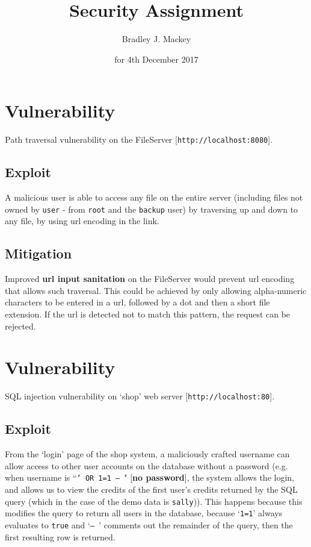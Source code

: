 \documentclass[11pt]{article}
\begin{document}
\title{\textbf{Security Assignment}}
\date{for 4th December 2017}
\author{Bradley J. Mackey}
\maketitle

\section{Vulnerability}

Path traversal vulnerability on the FileServer [\texttt{http://localhost:8080}].

\subsection{Exploit}

A malicious user is able to access any file on the entire server (including files not owned by \texttt{user} - from \texttt{root} and the \texttt{backup} user) by traversing up and down to any file, by using url encoding in the link.

\subsection{Mitigation}

Improved \textbf{url input sanitation} on the FileServer would prevent url encoding that allows such traversal. This could be achieved by only allowing alpha-numeric characters to be entered in a url, followed by a dot and then a short file extension. If the url is detected not to match this pattern, the request can be rejected.

\section{Vulnerability}

SQL injection vulnerability on `shop' web server [\texttt{http://localhost:80}].

\subsection{Exploit}

From the `login' page of the shop system, a maliciously crafted username can allow access to other user accounts on the database without a password (e.g. when username is ``\texttt{' OR 1=1 -- }" [\textbf{no password}], the system allows the login, and allows us to view the credits of the first user's credits returned by the SQL query (which in the case of the demo data is \texttt{sally})). This happens because this modifies the query to return all users in the database, because `\texttt{1=1}' always evaluates to \texttt{true} and `\texttt{-- }' comments out the remainder of the query, then the first resulting row is returned.
\end{document}
